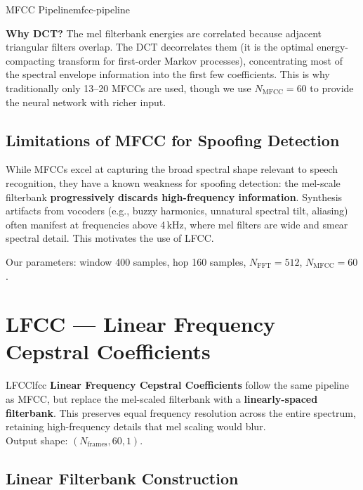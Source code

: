 \documentclass[12pt]{report}
\begin{document}
\begin{tecbox}{MFCC Pipeline}{mfcc-pipeline}
\begin{enumerate}
          \textbf{Why DCT?} The mel filterbank energies are correlated because adjacent
          triangular filters overlap. The DCT decorrelates them (it is the optimal
          energy-compacting transform for first-order Markov processes), concentrating most
          of the spectral envelope information into the first few coefficients. This is why
          traditionally only 13--20 MFCCs are used, though we use $N_\text{MFCC} = 60$
          to provide the neural network with richer input.
\end{enumerate}
\end{tecbox}

\subsection{Limitations of MFCC for Spoofing Detection}

While MFCCs excel at capturing the broad spectral shape relevant to speech recognition, they
have a known weakness for spoofing detection: the mel-scale filterbank \textbf{progressively
discards high-frequency information}. Synthesis artifacts from vocoders (e.g., buzzy harmonics,
unnatural spectral tilt, aliasing) often manifest at frequencies above 4\,kHz, where mel filters
are wide and smear spectral detail. This motivates the use of LFCC.

Our parameters: window 400 samples, hop 160 samples, $N_\text{FFT} = 512$, $N_\text{MFCC} = 60$.


\section{LFCC --- Linear Frequency Cepstral Coefficients}

\begin{dfnbox}{LFCC}{lfcc}
    \textbf{Linear Frequency Cepstral Coefficients} follow the same pipeline as MFCC, but
    replace the mel-scaled filterbank with a \textbf{linearly-spaced filterbank}. This preserves
    equal frequency resolution across the entire spectrum, retaining high-frequency details
    that mel scaling would blur. \\
    Output shape: $(N_\text{frames}, 60, 1)$.
\end{dfnbox}

\subsection{Linear Filterbank Construction}
\end{document}
